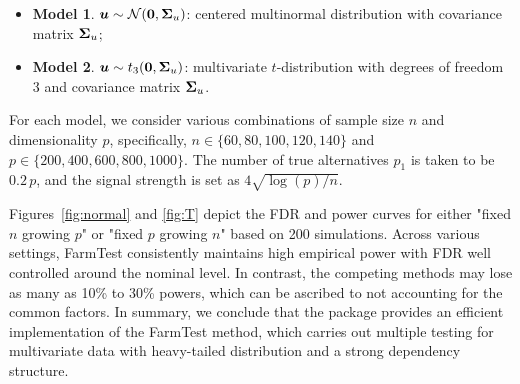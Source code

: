 \begin{itemize}
\item \textbf{Model 1}. $\bm{u} \sim {\cal N}(\mathbf{0}, \bm{\Sigma}_u)$: centered multinormal distribution with covariance matrix $\bm{\Sigma}_u$;
\item \textbf{Model 2}. $\bm{u} \sim  t_{3}(\mathbf{0}, \bm{\Sigma}_u)$: multivariate $t$-distribution with degrees of freedom 3 and covariance matrix $\bm{\Sigma}_u$.
\end{itemize}

For each  model, we consider various combinations of sample size $n$ and dimensionality $p$, specifically, $n \in \{60, 80, 100, 120, 140\}$ and $p \in \{200, 400, 600, 800, 1000\}$. The number of true alternatives $p_1$ is taken to be $0.2\, p$, and the signal strength is set as $4 \sqrt{\log(p) / n}$.


Figures~\ref{fig:normal} and \ref{fig:T} depict the FDR and power curves for either "fixed $n$ growing $p$" or "fixed $p$ growing $n$" based on 200 simulations.
Across various settings, FarmTest consistently maintains high empirical power with   FDR well controlled around the nominal level.
In contrast, the competing methods may lose as many as 10\% to 30\% powers, which can be ascribed to not accounting for the common factors.
 In summary, we conclude that the  package provides an efficient implementation of the FarmTest method, which carries out multiple testing for multivariate data with heavy-tailed distribution and a strong dependency structure.


